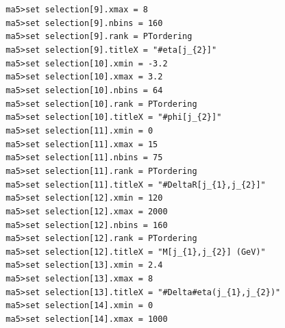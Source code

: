 \documentclass[a4paper, 10pt]{article}
\begin{document}
\texttt{ }\texttt{ }\texttt{ma5>set selection[9].xmax = 8\\
}
\texttt{ }\texttt{ }\texttt{ma5>set selection[9].nbins = 160\\
}
\texttt{ }\texttt{ }\texttt{ma5>set selection[9].rank = PTordering\\
}
\texttt{ }\texttt{ }\texttt{ma5>set selection[9].titleX = "\#eta[j\_\{2\}]"\\
}
\texttt{ }\texttt{ }\texttt{ma5>set selection[10].xmin = -3.2\\
}
\texttt{ }\texttt{ }\texttt{ma5>set selection[10].xmax = 3.2\\
}
\texttt{ }\texttt{ }\texttt{ma5>set selection[10].nbins = 64\\
}
\texttt{ }\texttt{ }\texttt{ma5>set selection[10].rank = PTordering\\
}
\texttt{ }\texttt{ }\texttt{ma5>set selection[10].titleX = "\#phi[j\_\{2\}]"\\
}
\texttt{ }\texttt{ }\texttt{ma5>set selection[11].xmin = 0\\
}
\texttt{ }\texttt{ }\texttt{ma5>set selection[11].xmax = 15\\
}
\texttt{ }\texttt{ }\texttt{ma5>set selection[11].nbins = 75\\
}
\texttt{ }\texttt{ }\texttt{ma5>set selection[11].rank = PTordering\\
}
\texttt{ }\texttt{ }\texttt{ma5>set selection[11].titleX = "\#DeltaR[j\_\{1\},j\_\{2\}]"\\
}
\texttt{ }\texttt{ }\texttt{ma5>set selection[12].xmin = 120\\
}
\texttt{ }\texttt{ }\texttt{ma5>set selection[12].xmax = 2000\\
}
\texttt{ }\texttt{ }\texttt{ma5>set selection[12].nbins = 160\\
}
\texttt{ }\texttt{ }\texttt{ma5>set selection[12].rank = PTordering\\
}
\texttt{ }\texttt{ }\texttt{ma5>set selection[12].titleX = "M[j\_\{1\},j\_\{2\}] (GeV)"\\
}
\texttt{ }\texttt{ }\texttt{ma5>set selection[13].xmin = 2.4\\
}
\texttt{ }\texttt{ }\texttt{ma5>set selection[13].xmax = 8\\
}
\texttt{ }\texttt{ }\texttt{ma5>set selection[13].titleX = "\#Delta\#eta(j\_\{1\},j\_\{2\})"\\
}
\texttt{ }\texttt{ }\texttt{ma5>set selection[14].xmin = 0\\
}
\texttt{ }\texttt{ }\texttt{ma5>set selection[14].xmax = 1000\\
}
\end{document}
